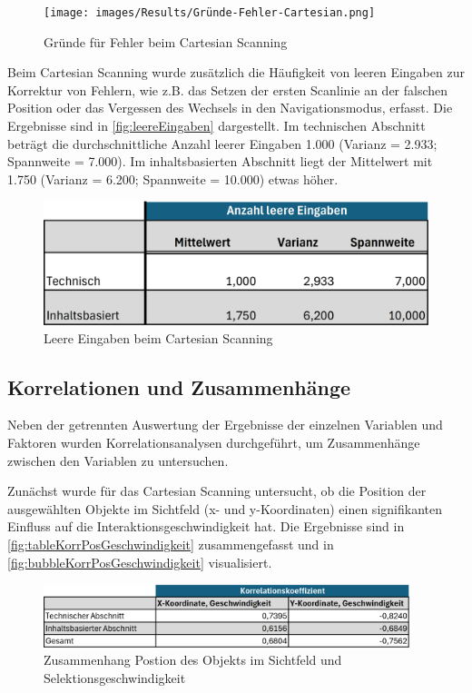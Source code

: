 \begin{figure}[tbh]
 \centering
\texttt{[image: images/Results/Gründe-Fehler-Cartesian.png]}
 \caption{Gründe für Fehler beim Cartesian Scanning}
 \label{fig:gründeFehlerCartesian}
\end{figure}

Beim Cartesian Scanning wurde zusätzlich die Häufigkeit von leeren Eingaben zur Korrektur von Fehlern, wie z.B. das Setzen der ersten Scanlinie an der falschen Position oder das Vergessen des Wechsels in den Navigationsmodus, erfasst. Die Ergebnisse sind in \autoref{fig:leereEingaben} dargestellt. 
Im technischen Abschnitt beträgt die durchschnittliche Anzahl leerer Eingaben 1.000 (Varianz = 2.933; Spannweite = 7.000). Im inhaltsbasierten Abschnitt liegt der Mittelwert mit 1.750 (Varianz = 6.200; Spannweite = 10.000) etwas höher.

\begin{figure}[tbh]
    \centering
    \includegraphics{images/Results/leereEingaben.png}
    \caption{Leere Eingaben beim Cartesian Scanning}
    \label{fig:leereEingaben}
\end{figure}

\subsection{Korrelationen und Zusammenhänge}

Neben der getrennten Auswertung der Ergebnisse der einzelnen Variablen und Faktoren wurden Korrelationsanalysen durchgeführt, um Zusammenhänge zwischen den Variablen zu untersuchen.

Zunächst wurde für das Cartesian Scanning untersucht, ob die Position der ausgewählten Objekte im Sichtfeld (x- und y-Koordinaten) einen signifikanten Einfluss auf die Interaktionsgeschwindigkeit hat. Die Ergebnisse sind in \autoref{fig:tableKorrPosGeschwindigkeit} zusammengefasst und in \autoref{fig:bubbleKorrPosGeschwindigkeit} visualisiert. 

\begin{figure}[tbh]
    \centering
    \includegraphics[width=0.95\textwidth]{images/Results/Korrelation-Position-Geschwindigkeit-Table.png}
    \caption{Zusammenhang Postion des Objekts im Sichtfeld und Selektionsgeschwindigkeit}
    \label{fig:tableKorrPosGeschwindigkeit}
\end{figure}

